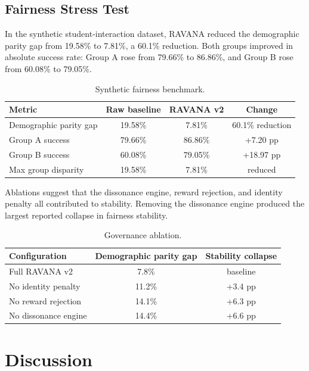 \documentclass[11pt]{article}
\begin{document}
\subsection{Fairness Stress Test}
In the synthetic student-interaction dataset, RAVANA reduced the demographic parity gap from 19.58\% to 7.81\%, a 60.1\% reduction. Both groups improved in absolute success rate: Group A rose from 79.66\% to 86.86\%, and Group B rose from 60.08\% to 79.05\%.

\begin{table}[h]
\centering
\caption{Synthetic fairness benchmark.}
\begin{tabular}{lccc}
\toprule
Metric & Raw baseline & RAVANA v2 & Change \\
\midrule
Demographic parity gap & 19.58\% & 7.81\% & 60.1\% reduction \\
Group A success & 79.66\% & 86.86\% & +7.20 pp \\
Group B success & 60.08\% & 79.05\% & +18.97 pp \\
Max group disparity & 19.58\% & 7.81\% & reduced \\
\bottomrule
\end{tabular}
\end{table}

Ablations suggest that the dissonance engine, reward rejection, and identity penalty all contributed to stability. Removing the dissonance engine produced the largest reported collapse in fairness stability.

\begin{table}[h]
\centering
\caption{Governance ablation.}
\label{tab:governance-ablation}
\begin{tabular}{lcc}
\toprule
Configuration & Demographic parity gap & Stability collapse \\
\midrule
Full RAVANA v2 & 7.8\% & baseline \\
No identity penalty & 11.2\% & +3.4 pp \\
No reward rejection & 14.1\% & +6.3 pp \\
No dissonance engine & 14.4\% & +6.6 pp \\
\bottomrule
\end{tabular}
\end{table}

\section{Discussion}
\end{document}
